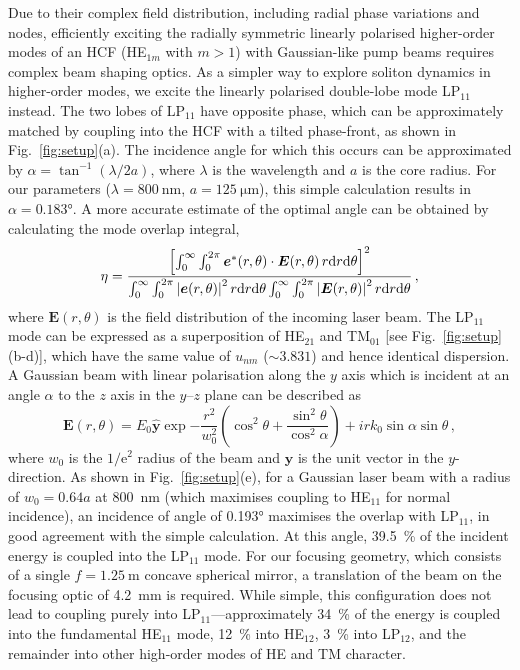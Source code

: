 \documentclass[amsmath, preprint, floatfix]{revtex4-2}
\begin{document}
Due to their complex field distribution, including radial phase variations and nodes, efficiently exciting the radially symmetric linearly polarised higher-order modes of an HCF (HE$_{1m}$ with $m>1$) with Gaussian-like pump beams requires complex beam shaping optics. As a simpler way to explore soliton dynamics in higher-order modes, we excite the linearly polarised double-lobe mode LP$_{11}$ instead. The two lobes of LP$_{11}$ have opposite phase, which can be approximately matched by coupling into the HCF with a tilted phase-front, as shown in Fig.~\ref{fig:setup}(a). The incidence angle for which this occurs can be approximated by $\alpha = \tan^{-1}\left(\lambda/2a\right)$, where $\lambda$ is the wavelength and $a$ is the core radius. For our parameters ($\lambda=\SI{800}{\nm}$, $a=\SI{125}{\micro\meter}$), this simple calculation results in $\alpha=\ang{0.183}$. A more accurate estimate of the optimal angle can be obtained by calculating the mode overlap integral,
\begin{equation}
    \label{eq:eta}
    \eta= \frac{
    \qty[\int_0^\infty\int_0^{2\pi}\bm{e}^*(r, \theta)\cdot \bm{E}(r, \theta)\,r\dd r\dd\theta]^2}
    {\int_0^\infty\int_0^{2\pi}\abs{\bm{e}(r,\theta)}^2\,r\dd r\dd\theta \int_0^\infty\int_0^{2\pi}\abs{\bm{E}(r,\theta)}^2\,r\dd r\dd\theta}\,,
\end{equation}
where $\bm{E}(r, \theta)$ is the field distribution of the incoming laser beam. The LP$_{11}$ mode can be expressed as a superposition of HE$_{21}$ and TM$_{01}$ [see Fig.~\ref{fig:setup}(b-d)], which have the same value of $u_{nm}$ ($\sim 3.831$) and hence identical dispersion. A Gaussian beam with linear polarisation along the $y$ axis which is incident at an angle $\alpha$ to the $z$ axis in the $y$--$z$ plane can be described as
\begin{equation}
    \bm{E}(r, \theta) = E_0 \hat{\bm{y}} \exp{-\frac{r^2}{w_0^2}\left(\cos^2{\theta}+\frac{\sin^2{\theta}}{\cos^2{\alpha}}\right) + i rk_0\sin{\alpha}\sin{\theta}}\,,
\end{equation}
where $w_0$ is the $1/\mathrm{e}^2$ radius of the beam and $\hat{\bm{y}}$ is the unit vector in the $y$-direction. As shown in Fig.~\ref{fig:setup}(e), for a Gaussian laser beam with a radius of $w_0=0.64a$ at \SI{800}{\nm} (which maximises coupling to HE$_{11}$ for normal incidence), an incidence of angle of \ang{0.193} maximises the overlap with LP$_{11}$, in good agreement with the simple calculation. At this angle, \SI{39.5}{\percent} of the incident energy is coupled into the LP$_{11}$ mode. For our focusing geometry, which consists of a single $f=\SI{1.25}{\metre}$ concave spherical mirror, a translation of the beam on the focusing optic of \SI{4.2}{\mm} is required. While simple, this configuration does not lead to coupling purely into LP$_{11}$---approximately \SI{34}{\percent} of the energy is coupled into the fundamental HE$_{11}$ mode, \SI{12}{\percent} into HE$_{12}$, \SI{3}{\percent} into LP$_{12}$, and the remainder into other high-order modes of HE and TM character.
\end{document}
